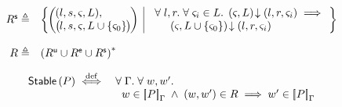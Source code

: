 \begin{definition}[Rely]
\[\begin{array}{r l}
	
	\shiftR \eqdef & 
	\left\{
 	\hspace*{-0.2cm}
	 \begin{array}{l | r}
	   \left(
	   \hspace*{-0.2cm}
	   \begin{array}{l}
	     (l, s, \amod{}, L),\\
 	     \left(
	     \hspace*{-0.2cm}
	     \begin{array}{l}
	      l,
	      s,
	      \amod{}, L \cup \{\amod{0}\}
	     \end{array}
 	    \hspace*{-0.2cm}
 	    \right)
	   \end{array}
	   \hspace*{-0.2cm}
 	  \right)
	   &
 	  \begin{array}{l}
 	  	\for{l, r} \for{\amod{i} \in L} \extendsAM{\amod{}, L}{l}{r}{\amod{i}} \implies \\
 	  	\hspace*{0.5cm}\extendsAM{\amod{}, L \cup \{\amod{0}\}}{l}{r}{\amod{i}}
			
   	\end{array}
 	\end{array}
 	\hspace*{-0.2cm}
	\right\}\\\\
	
	\rely \eqdef & \left(\updateR \cup \extendR \cup \shiftR \right)^{*}
\end{array}
\]
%
\end{definition}
%
%
\begin{definition}[Stability]
\[	
\begin{array}{r l}
	\stable{P} \iffdef &
	\for{\lenv}\for{w, w'} \\
	& \hspace*{0.2cm} w \in \sem[\lenv]{P} \;\land\; (w, w') \in \rely \implies
	 w' \in \sem[\lenv]{P}
\end{array}
\]
\end{definition}
